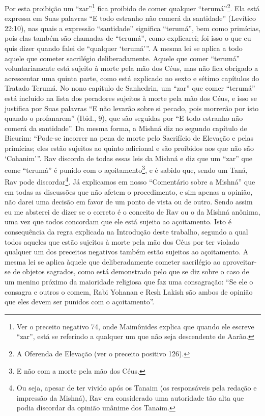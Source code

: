 Por esta proibição um ``zar''\footnote{Ver o preceito negativo 74, onde Maimônides explica que quando ele
  escreve ``zar'', está se referindo a qualquer um que não seja
  descendente de Aarão.} fica proibido de
comer qualquer ``terumá''\footnote{A Oferenda de Elevação (ver o preceito positivo 126).}. Ela está expressa em
Suas palavras ``E todo estranho não comerá
da santidade'' (Levítico 22:10), nas quais a expressão ``santidade''
significa ``terumá'', bem como primícias, pois elas também são chamadas
de ``terumá'', como explicarei; foi isso o que eu quis dizer quando
falei de ``qualquer `terumá'''.
A mesma lei se aplica a todo aquele que cometer sacrilégio
deliberadamente.
Aquele que comer ``terumá'' voluntariamente está sujeito à morte
pela mão dos Céus, mas não fica obrigado a acrescentar uma quinta parte,
como está explicado no sexto e sétimo capítulos do Tratado Terumá. No
nono capítulo de Sanhedrin, um ``zar'' que comer ``terumá'' está incluído na
lista dos
pecadores sujeitos à morte pela mão dos Céus, e isso se justifica por
Suas palavras ``E não levarão sobre si pecado, pois morrerão por isto
quando o profanarem'' (Ibid., 9), que são seguidas por ``E todo estranho
não comerá da santidade''. Da mesma forma, a Mishná diz no segundo
capítulo de Bicurim: ``Pode-se incorrer na pena de morte pelo Sacrifício de Elevação e pelas primícias; eles
estão sujeitos ao quinto adicional e são proibidos aos que não são
`Cohanim'''.
Rav discorda de todas essas leis da Mishná e diz que um ``zar'' que
come ``terumá'' é punido com o açoitamento\footnote{E não com a morte pela mão dos Céus.}, e é
sabido que, sendo um Taná, Rav pode discordar\footnote{Ou seja, apesar de ter vivido após os Tanaim (os responsáveis pela
  redação e impressão da Mishná), Rav era considerado uma autoridade tão
  alta que podia discordar da opinião unânime dos Tanaim.}. Já
explicamos em nosso ``Comentário sobre a Mishná'' que em todas as
discussões que não afetem o procedimento, e sim apenas a opinião, não darei uma decisão em favor de um ponto de vista ou de
outro. Sendo assim eu me absterei de dizer se o correto é o conceito de
Rav ou o da Mishná anônima, uma vez que todos concordam que ele está
sujeito ao açoitamento. Isto é consequência da regra explicada na
Introdução deste trabalho, segundo a qual todos aqueles que estão
sujeitos à morte pela mão dos Céus por ter violado qualquer um dos
preceitos negativos também estão sujeitos ao açoitamento. A mesma lei se
aplica àquele que deliberadamente cometer sacrilégio ao aproveitar-se
de objetos sagrados, como está demonstrado pelo que se diz sobre o caso
de um menino próximo da maioridade religiosa que faz uma consagração:
``Se ele o consagra e outros o comem, Rabi Yohanan e Resh Lakish são
ambos de opinião que eles devem ser punidos com o açoitamento''.

